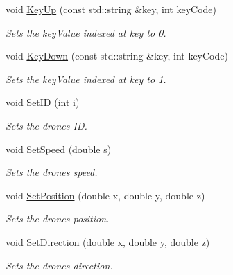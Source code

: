 \begin{DoxyCompactItemize}
void \hyperlink{classDrone_a95aca396f093db8ec2a8e533e6a8bd60}{Key\+Up} (const std\+::string \&key, int key\+Code)
\begin{DoxyCompactList}\small\item\em Sets the key\+Value indexed at key to 0. \end{DoxyCompactList}\item 
\mbox{\label{classDrone_a83a6384bcefa360055df86dca5ec3afc}} 
void \hyperlink{classDrone_a83a6384bcefa360055df86dca5ec3afc}{Key\+Down} (const std\+::string \&key, int key\+Code)
\begin{DoxyCompactList}\small\item\em Sets the key\+Value indexed at key to 1. \end{DoxyCompactList}\item 
\mbox{\label{classDrone_ad2ad45f67c4c74a2364d09b5cccb991d}} 
void \hyperlink{classDrone_ad2ad45f67c4c74a2364d09b5cccb991d}{Set\+ID} (int i)
\begin{DoxyCompactList}\small\item\em Sets the drone\textquotesingle{}s ID. \end{DoxyCompactList}\item 
\mbox{\label{classDrone_a84fd5637a4a226c39c3ad3cd256c77e2}} 
void \hyperlink{classDrone_a84fd5637a4a226c39c3ad3cd256c77e2}{Set\+Speed} (double s)
\begin{DoxyCompactList}\small\item\em Sets the drone\textquotesingle{}s speed. \end{DoxyCompactList}\item 
\mbox{\label{classDrone_aceb8b8df70fd3e70a6fc1cc8fefe9512}} 
void \hyperlink{classDrone_aceb8b8df70fd3e70a6fc1cc8fefe9512}{Set\+Position} (double x, double y, double z)
\begin{DoxyCompactList}\small\item\em Sets the drone\textquotesingle{}s position. \end{DoxyCompactList}\item 
\mbox{\label{classDrone_a45a3478122b291066f9cbd80533a686b}} 
void \hyperlink{classDrone_a45a3478122b291066f9cbd80533a686b}{Set\+Direction} (double x, double y, double z)
\begin{DoxyCompactList}\small\item\em Sets the drone\textquotesingle{}s direction. \end{DoxyCompactList}\item 

\end{DoxyCompactItemize}
